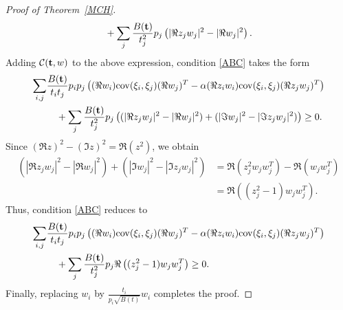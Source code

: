 \documentclass[9pt, a4paper]{amsart}
\newcommand{\1}{{\chi_{}}}%
\numberwithin{equation}{section}
\begin{document}
\begin{proof}[Proof of Theorem~\ref{MCH}]
\begin{align*}
		&\quad + \sum_j \frac{B({\bf{t}})}{t_j^2} p_j \left( |\Re z_j w_j|^2 - |\Re w_j|^2 \right).
	\end{align*}
Adding \( \mathcal{C}({\bf{t}},w) \) to the above expression, condition \eqref{ABC} takes the form 
	\begin{align*}
		\sum_{i,j} & \frac{B({\bf{t}})}{t_i t_j} p_i p_j 
		\left( (\Re w_{i}) \mathrm{cov}(\xi_{i}, \xi_{j}) (\Re w_{j})^{T} 
		- \alpha (\Re z_{i} w_{i}) \mathrm{cov}(\xi_{i}, \xi_{j}) (\Re z_{j} w_{j})^{T} \right) \\
		&\quad + \sum_j \frac{B({\bf{t}})}{t_j^2} p_j \left( (|\Re z_j w_j|^2 - |\Re w_j|^2) + (|\Im w_{j}|^2 - |\Im z_j w_{j}|^2) \right) \geq 0.
	\end{align*}
Since \( (\Re z)^2 - (\Im z)^2 = \Re(z^2) \), we obtain  
	\begin{align*}
		(|\Re z_j w_j|^2 - |\Re w_j|^2) + (|\Im w_{j}|^2 - |\Im z_j w_{j}|^2) 
		&= \Re(z_j^2 w_j w_j^T) - \Re(w_j w_j^T) \\
		&= \Re \left( (z_j^2 - 1) w_j w_j^T \right).
	\end{align*}
Thus, condition \eqref{ABC} reduces to  
	\begin{align*}
	\sum_{i,j} & \frac{B({\bf{t}})}{t_i t_j} p_i p_j 
	\left( (\Re w_{i}) \mathrm{cov}(\xi_{i}, \xi_{j}) (\Re w_{j})^{T} 
	- \alpha (\Re z_{i} w_{i}) \mathrm{cov}(\xi_{i}, \xi_{j}) (\Re z_{j} w_{j})^{T} \right) \\
	&\quad + \sum_j \frac{B({\bf{t}})}{t_j^2} p_j \Re \left( (z_j^2 - 1) w_j w_j^T \right) \geq 0.
\end{align*}
Finally, replacing  \( w_i \) by \( \frac{t_i}{p_i\sqrt{B(t)}} w_i \)  completes the proof.  
\end{proof}
\end{document}
